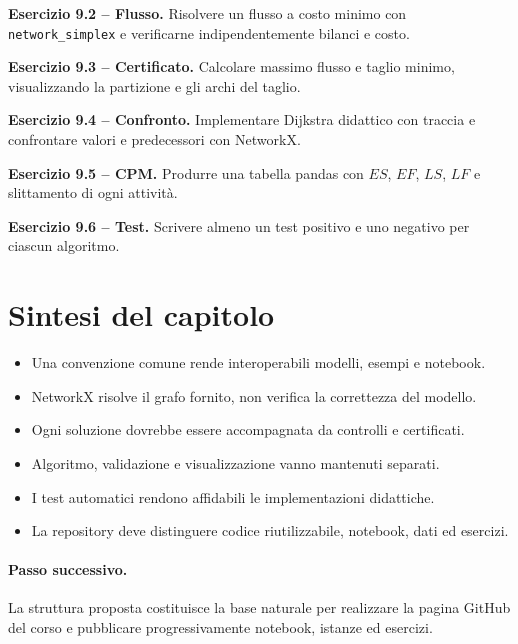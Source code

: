 \documentclass[11pt,a4paper]{article}
\begin{document}
\medskip\textbf{Esercizio 9.2 -- Flusso.} Risolvere un flusso a costo minimo con \texttt{network\_simplex} e verificarne indipendentemente bilanci e costo.

\medskip\textbf{Esercizio 9.3 -- Certificato.} Calcolare massimo flusso e taglio minimo, visualizzando la partizione e gli archi del taglio.

\medskip\textbf{Esercizio 9.4 -- Confronto.} Implementare Dijkstra didattico con traccia e confrontare valori e predecessori con NetworkX.

\medskip\textbf{Esercizio 9.5 -- CPM.} Produrre una tabella pandas con $ES$, $EF$, $LS$, $LF$ e slittamento di ogni attività.

\medskip\textbf{Esercizio 9.6 -- Test.} Scrivere almeno un test positivo e uno negativo per ciascun algoritmo.

\section{Sintesi del capitolo}
\begin{learningbox}\begin{itemize}[nosep]
\item Una convenzione comune rende interoperabili modelli, esempi e notebook.
\item NetworkX risolve il grafo fornito, non verifica la correttezza del modello.
\item Ogni soluzione dovrebbe essere accompagnata da controlli e certificati.
\item Algoritmo, validazione e visualizzazione vanno mantenuti separati.
\item I test automatici rendono affidabili le implementazioni didattiche.
\item La repository deve distinguere codice riutilizzabile, notebook, dati ed esercizi.
\end{itemize}\end{learningbox}

\paragraph{Passo successivo.} La struttura proposta costituisce la base naturale per realizzare la pagina GitHub del corso e pubblicare progressivamente notebook, istanze ed esercizi.
\end{document}
